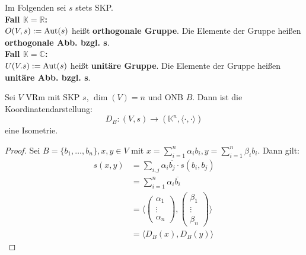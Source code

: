 \documentclass[parskip,a4paper,twoside,DIV15,BCOR12mm]{scrbook}
\begin{document}
\begin{definition}
Im Folgenden sei $s$ stets SKP.\\
\textbf{Fall $\mathbb{K}=\mathbb{R}$:}\\
$O(V,s):=\operatorname{Aut}(s)$ heißt \textbf{orthogonale Gruppe}. Die Elemente der Gruppe
heißen \textbf{orthogonale Abb. bzgl. s}.\\
\textbf{Fall $\mathbb{K}=\mathbb{C}$:}\\
$U(V.s):=\operatorname{Aut}(s)$ heißt \textbf{unitäre Gruppe}. Die Elemente der Gruppe heißen
\textbf{unitäre Abb. bzgl. s}.
\end{definition}

\begin{comment}
Eine wichtige Isometrie ist: abstrakter VRm $\cong$ Standardraum
\end{comment}

\begin{theo}
Sei $V$ VRm mit SKP $s$, $\dim(V)=n$ und ONB $B$. Dann ist die Koordinatendarstellung:\\
\[D_B:(V,s)\to(\mathbb{K}^n,\langle\cdot,\cdot\rangle)\] eine Isometrie.
\end{theo}

\begin{proof}
Sei $B=\{b_1,\ldots,b_n\}, x,y\in V$ mit $x=\sum_{i=1}^n{\alpha_i b_i},
y=\sum_{i=1}^n{\beta_i b_i}$. Dann gilt:
\begin{align*}
s(x,y)&=\sum_{i,j}{\alpha_i \overline{b_j}\cdot s(b_i,b_j)}\\
&= \sum_{i=1}^n{\alpha_i \overline{b_i}}\\
&= \langle
\begin{pmatrix}
\alpha_1\\
\vdots\\
\alpha_n
\end{pmatrix},
\begin{pmatrix}
\beta_1\\
\vdots\\
\beta_n
\end{pmatrix} 
\rangle\\
&= \langle D_B(x),D_B(y)\rangle
\end{align*}
\end{proof}

\begin{comment}
\begin{enumerate}
\index{Längentreue}\index{Winkeltreue}
\item Sei $\Phi: V_1\to V_2$ Morphismus von SKP-Räumen, dann ist $\Phi$ \textbf{längentreu}.
\[\iff\|x\|_1 = \|\Phi(x)\|_2\]
\textbf{Winkeltreue} für $K=\mathbb{R}$ bedeutet: 
\[\frac{\langle x_1,y_1\rangle_1}{\|x_1\|_1\|y_1\|_1} = \frac{\langle\Phi(x_1),
\Phi(y_1)\rangle_2}{\|\Phi(x_1)\|_2\|\Phi(y_1)\|_2}\]
\item $\Phi:(V,s)\to(V,s)$ Endomorphismus von SKP-Räumen und $\dim(V)<\infty
\implies \Phi$ ist Isomorphismus und Automorphismus, also orthogonal und unitär. 
\end{enumerate}
\end{comment}
\end{document}
